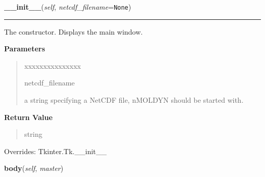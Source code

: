 \hspace{.8\funcindent}\begin{boxedminipage}{\funcwidth}

    \raggedright \textbf{\_\_init\_\_}(\textit{self}, \textit{netcdf\_filename}={\tt None})

    \vspace{-1.5ex}

    \rule{\textwidth}{0.5\fboxrule}
\setlength{\parskip}{2ex}
    The constructor. Displays the main window.

\setlength{\parskip}{1ex}
      \textbf{Parameters}
      \vspace{-1ex}

      \begin{quote}
        \begin{Ventry}{xxxxxxxxxxxxxxx}

          \item[netcdf\_filename]

          a string specifying a NetCDF file, nMOLDYN should be started 
          with.

        \end{Ventry}

      \end{quote}

      \textbf{Return Value}
    \vspace{-1ex}

      \begin{quote}
      string

      \end{quote}

      Overrides: Tkinter.Tk.\_\_init\_\_

    \end{boxedminipage}

    \label{nMOLDYN:GUI:MainDialog:MainDialog:body}

    \vspace{0.5ex}

\hspace{.8\funcindent}\begin{boxedminipage}{\funcwidth}

    \raggedright \textbf{body}(\textit{self}, \textit{master})

\setlength{\parskip}{2ex}
\setlength{\parskip}{1ex}
    \end{boxedminipage}

